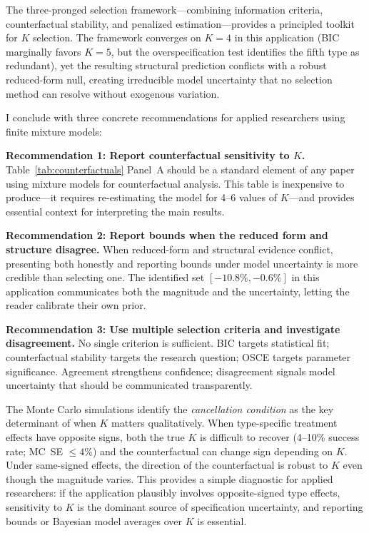 \documentclass[12pt]{article}
\begin{document}
The three-pronged selection framework---combining information criteria, counterfactual stability, and penalized estimation---provides a principled toolkit for $K$ selection. The framework converges on $K=4$ in this application (BIC marginally favors $K=5$, but the overspecification test identifies the fifth type as redundant), yet the resulting structural prediction conflicts with a robust reduced-form null, creating irreducible model uncertainty that no selection method can resolve without exogenous variation.

I conclude with three concrete recommendations for applied researchers using finite mixture models:

\textbf{Recommendation 1: Report counterfactual sensitivity to $K$.} Table~\ref{tab:counterfactuals} Panel~A should be a standard element of any paper using mixture models for counterfactual analysis. This table is inexpensive to produce---it requires re-estimating the model for 4--6 values of $K$---and provides essential context for interpreting the main results.

\textbf{Recommendation 2: Report bounds when the reduced form and structure disagree.} When reduced-form and structural evidence conflict, presenting both honestly and reporting bounds under model uncertainty is more credible than selecting one. The identified set $[-10.8\%, -0.6\%]$ in this application communicates both the magnitude and the uncertainty, letting the reader calibrate their own prior.

\textbf{Recommendation 3: Use multiple selection criteria and investigate disagreement.} No single criterion is sufficient. BIC targets statistical fit; counterfactual stability targets the research question; OSCE targets parameter significance. Agreement strengthens confidence; disagreement signals model uncertainty that should be communicated transparently.

The Monte Carlo simulations identify the \textit{cancellation condition} as the key determinant of when $K$ matters qualitatively. When type-specific treatment effects have opposite signs, both the true $K$ is difficult to recover (4--10\% success rate; MC~SE $\leq 4$\%) and the counterfactual can change sign depending on $K$. Under same-signed effects, the direction of the counterfactual is robust to $K$ even though the magnitude varies. This provides a simple diagnostic for applied researchers: if the application plausibly involves opposite-signed type effects, sensitivity to $K$ is the dominant source of specification uncertainty, and reporting bounds or Bayesian model averages over $K$ is essential.
\end{document}
